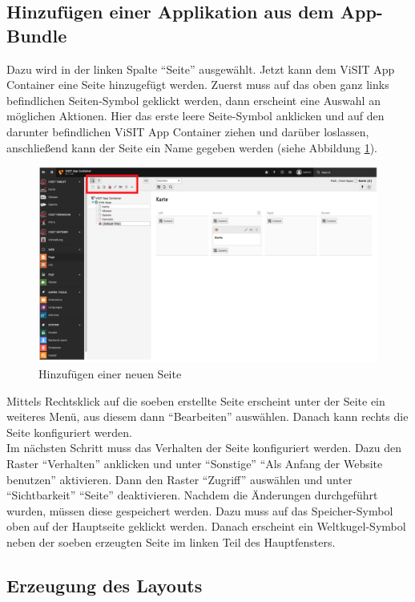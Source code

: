 \subsection{Hinzufügen einer Applikation aus dem App-Bundle}

Dazu wird in der linken Spalte “Seite” ausgewählt. Jetzt kann dem ViSIT App Container eine Seite hinzugefügt werden. Zuerst muss auf das oben ganz links befindlichen Seiten-Symbol geklickt werden, dann erscheint eine Auswahl an möglichen Aktionen. Hier das erste leere Seite-Symbol anklicken und auf den darunter befindlichen ViSIT App Container ziehen und darüber loslassen, anschließend kann der Seite ein Name gegeben werden (siehe Abbildung \ref{img:neue_seite_hinzufuegen}).

\begin{figure}[ht!]
\centering
\includegraphics[width=12cm]{Figures/paula/typo3/neue_seite_hinzufuegen.png}
\caption{Hinzufügen einer neuen Seite}
\label{img:neue_seite_hinzufuegen}
\end{figure}

Mittels Rechtsklick auf die soeben erstellte Seite erscheint unter der Seite ein weiteres Menü, aus diesem dann “Bearbeiten” auswählen. Danach kann rechts die Seite konfiguriert werden.\\
Im nächsten Schritt muss das Verhalten der Seite konfiguriert werden. Dazu den Raster “Verhalten” anklicken und unter “Sonstige” “Als Anfang der Website benutzen” aktivieren.
Dann den Raster “Zugriff” auswählen und unter “Sichtbarkeit” “Seite” deaktivieren.
Nachdem die Änderungen durchgeführt wurden, müssen diese gespeichert werden. Dazu muss auf das Speicher-Symbol oben auf der Hauptseite geklickt werden. Danach erscheint ein Weltkugel-Symbol neben der soeben erzeugten Seite im linken Teil des Hauptfensters.

\subsection{Erzeugung des Layouts}

